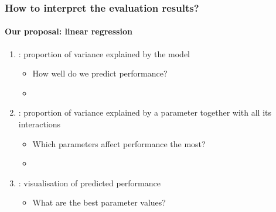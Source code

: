 \documentclass[t]{beamer} %
\begin{document}
\begin{frame}
  \frametitle{\Large{How to interpret the evaluation results?}}
  \framesubtitle{Our proposal: linear regression}

  \begin{center}
  \end{center} 

  \gap
  \begin{enumerate}
  \item<2-> : proportion of variance explained by the model
    \begin{itemize}
    \item[$\leadsto$] How well do we predict performance?
    \item[]
    \end{itemize}
  \item<3-> : proportion of variance explained by a parameter together with all its interactions 
    \begin{itemize}
    \item[$\leadsto$] Which parameters affect performance the most?
    \item[]
    \end{itemize}
  \item<4-> : visualisation of predicted performance  
    \begin{itemize}
    \item[$\leadsto$] What are the best parameter values?
    \end{itemize}
  \end{enumerate}
\end{frame}   
\end{document}
